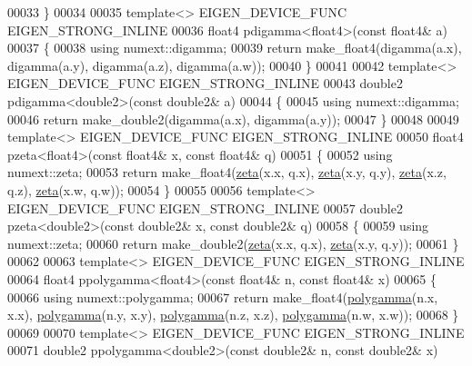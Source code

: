 \begin{DoxyCode}
00033 \}
00034 
00035 \textcolor{keyword}{template}<> EIGEN\_DEVICE\_FUNC EIGEN\_STRONG\_INLINE
00036 float4 pdigamma<float4>(\textcolor{keyword}{const} float4& a)
00037 \{
00038   \textcolor{keyword}{using} numext::digamma;
00039   \textcolor{keywordflow}{return} make\_float4(digamma(a.x), digamma(a.y), digamma(a.z), digamma(a.w));
00040 \}
00041 
00042 \textcolor{keyword}{template}<> EIGEN\_DEVICE\_FUNC EIGEN\_STRONG\_INLINE
00043 double2 pdigamma<double2>(\textcolor{keyword}{const} double2& a)
00044 \{
00045   \textcolor{keyword}{using} numext::digamma;
00046   \textcolor{keywordflow}{return} make\_double2(digamma(a.x), digamma(a.y));
00047 \}
00048 
00049 \textcolor{keyword}{template}<> EIGEN\_DEVICE\_FUNC EIGEN\_STRONG\_INLINE
00050 float4 pzeta<float4>(\textcolor{keyword}{const} float4& x, \textcolor{keyword}{const} float4& q)
00051 \{
00052     \textcolor{keyword}{using} numext::zeta;
00053     \textcolor{keywordflow}{return} make\_float4(\hyperlink{namespace_eigen_af9555e27540da78d2c4bdd17d3b750b1}{zeta}(x.x, q.x), \hyperlink{namespace_eigen_af9555e27540da78d2c4bdd17d3b750b1}{zeta}(x.y, q.y), \hyperlink{namespace_eigen_af9555e27540da78d2c4bdd17d3b750b1}{zeta}(x.z, q.z), 
      \hyperlink{namespace_eigen_af9555e27540da78d2c4bdd17d3b750b1}{zeta}(x.w, q.w));
00054 \}
00055 
00056 \textcolor{keyword}{template}<> EIGEN\_DEVICE\_FUNC EIGEN\_STRONG\_INLINE
00057 double2 pzeta<double2>(\textcolor{keyword}{const} double2& x, \textcolor{keyword}{const} double2& q)
00058 \{
00059     \textcolor{keyword}{using} numext::zeta;
00060     \textcolor{keywordflow}{return} make\_double2(\hyperlink{namespace_eigen_af9555e27540da78d2c4bdd17d3b750b1}{zeta}(x.x, q.x), \hyperlink{namespace_eigen_af9555e27540da78d2c4bdd17d3b750b1}{zeta}(x.y, q.y));
00061 \}
00062 
00063 \textcolor{keyword}{template}<> EIGEN\_DEVICE\_FUNC EIGEN\_STRONG\_INLINE
00064 float4 ppolygamma<float4>(\textcolor{keyword}{const} float4& n, \textcolor{keyword}{const} float4& x)
00065 \{
00066     \textcolor{keyword}{using} numext::polygamma;
00067     \textcolor{keywordflow}{return} make\_float4(\hyperlink{namespace_eigen_ae3b47a13a0699f5dbaa0623c11333dca}{polygamma}(n.x, x.x), \hyperlink{namespace_eigen_ae3b47a13a0699f5dbaa0623c11333dca}{polygamma}(n.y, x.y), 
      \hyperlink{namespace_eigen_ae3b47a13a0699f5dbaa0623c11333dca}{polygamma}(n.z, x.z), \hyperlink{namespace_eigen_ae3b47a13a0699f5dbaa0623c11333dca}{polygamma}(n.w, x.w));
00068 \}
00069 
00070 \textcolor{keyword}{template}<> EIGEN\_DEVICE\_FUNC EIGEN\_STRONG\_INLINE
00071 double2 ppolygamma<double2>(\textcolor{keyword}{const} double2& n, \textcolor{keyword}{const} double2& x)

\end{DoxyCode}
